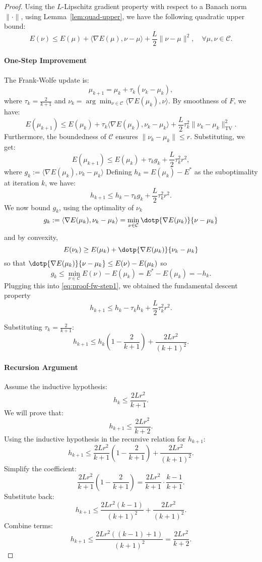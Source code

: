 \begin{proof}
Using the $L$-Lipschitz gradient property with respect to a Banach norm $\|\cdot\|$, using Lemma~\ref{lem:quad-upper},  we have the following quadratic upper bound:
\[
E(\nu) \leq E(\mu) + \langle \nabla E(\mu), \nu - \mu \rangle + \frac{L}{2} \|\nu - \mu\|^2, \quad \forall \mu, \nu \in \mathcal{C}.
\]

\paragraph{One-Step Improvement}
The Frank-Wolfe update is:
\[
\mu_{k+1} = \mu_k + \tau_k (\nu_k - \mu_k),
\]
where $\tau_k = \frac{2}{k+1}$ and $\nu_k = \arg\min_{\nu \in \mathcal{C}} \langle \nabla E(\mu_k), \nu \rangle$. By smoothness of $F$, we have:
\[
E(\mu_{k+1}) \leq E(\mu_k) + \tau_k \langle \nabla E(\mu_k), \nu_k - \mu_k \rangle + \frac{L}{2} \tau_k^2 \|\nu_k - \mu_k\|_{\mathrm{TV}}^2.
\]
Furthermore, the boundedness of $\mathcal{C}$ ensures $\|\nu_k - \mu_k\| \leq r$. Substituting, we get:
\[
	E(\mu_{k+1}) \leq E(\mu_k) + \tau_k g_k  + \frac{L}{2} \tau_k^2 r^2, 
\]
where $g_k := \langle \nabla E(\mu_k), \nu_k - \mu_k \rangle$
Defining $h_k = E(\mu_k) - E^*$ as the suboptimality at iteration $k$, we have:
\begin{equation}\label{eq:proof-fw-step1}
	h_{k+1} \leq h_k - \tau_k g_k + \frac{L}{2} \tau_k^2 r^2.
\end{equation}
We now bound $g_k$, using the optimality of $\nu_k$
$$
	g_k := \langle \nabla E(\mu_k), \nu_k - \mu_k \rangle = \min_{\nu \in \mathcal{C}} \dotp{\nabla E(\mu_k)}{\nu - \mu_k}
$$  
and by convexity, 
$$
	E(\nu_k) \geq E(\mu_k) + \dotp{ \nabla E(\mu_k) }{\nu_k-\mu_k}
$$
so that $\dotp{\nabla E(\mu_k)}{\nu - \mu_k} \leq E(\nu) - E(\mu_k)$ so 
$$
	g_k \leq \min_{\nu \in \mathcal{C}} E(\nu) - E(\mu_k) = E^* - E(\mu_k) = -h_k.
$$
Plugging this into \eqref{eq:proof-fw-step1}, we obtained the fundamental descent property
$$
	h_{k+1} \leq h_k - \tau_k h_k + \frac{L}{2} \tau_k^2 r^2.
$$

Substituting $\tau_k = \frac{2}{k+1}$:
\[
h_{k+1} \leq h_k \left( 1 - \frac{2}{k+1} \right) + \frac{2 L r^2}{(k+1)^2}.
\]

\paragraph{Recursion Argument}
Assume the inductive hypothesis:
\[
h_k \leq \frac{2 L r^2}{k+1}.
\]
We will prove that:
\[
h_{k+1} \leq \frac{2 L r^2}{k+2}.
\]
Using the inductive hypothesis in the recursive relation for $h_{k+1}$:
\[
h_{k+1} \leq \frac{2 L r^2}{k+1} \left( 1 - \frac{2}{k+1} \right) + \frac{2 L r^2}{(k+1)^2}.
\]
Simplify the coefficient:
\[
\frac{2 L r^2}{k+1} \left( 1 - \frac{2}{k+1} \right) = \frac{2 L r^2}{k+1} \cdot \frac{k-1}{k+1}.
\]
Substitute back:
\[
h_{k+1} \leq \frac{2 L r^2 (k-1)}{(k+1)^2} + \frac{2 L r^2}{(k+1)^2}.
\]
Combine terms:
\[
h_{k+1} \leq \frac{2 L r^2 \left( (k-1) + 1 \right)}{(k+1)^2} = \frac{2 L r^2}{k+2}.
\]
\end{proof}

